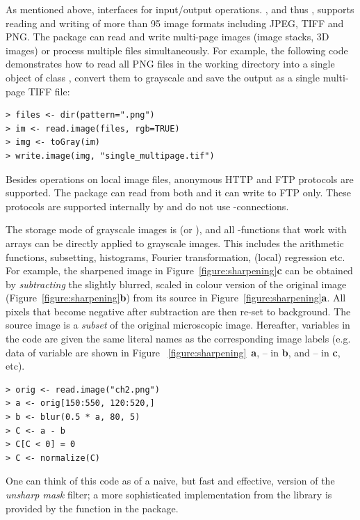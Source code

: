 As mentioned above,  interfaces  for input/output operations. , and thus , supports reading and writing of more than 95 image formats including JPEG, TIFF and PNG. The package can read and write multi-page images (image stacks, 3D images) or process multiple files simultaneously. For example, the following code demonstrates how to read all PNG files in the working directory into a single object of class , convert them to grayscale and save the output as a single multi-page TIFF file:

\begin{verbatim}
> files <- dir(pattern=".png")
> im <- read.image(files, rgb=TRUE)
> img <- toGray(im)
> write.image(img, "single_multipage.tif")
\end{verbatim}

Besides operations on local image files, anonymous HTTP and FTP protocols are supported. The package can read from both and it can write to FTP only. These protocols are supported internally by  and do not use \R{}-connections.

The storage mode of grayscale images is  (or ), and all \R{}-functions that work with arrays can be directly applied to grayscale images. This includes the arithmetic functions, subsetting, histograms, Fourier transformation, (local) regression etc. For example, the sharpened image in Figure~\ref{figure:sharpening}{\bf c} can be obtained by {\em subtracting} the slightly blurred, scaled in colour version of the original image (Figure~\ref{figure:sharpening}{\bf b}) from its source in Figure~\ref{figure:sharpening}{\bf a}. All pixels that become negative after subtraction are then re-set to background. The source image is a {\em subset} of the original microscopic image. Hereafter, variables in the code are given the same literal names as the corresponding image labels (e.g. data of variable  are shown in Figure ~\ref{figure:sharpening}~{\bf a},  -- in {\bf b}, and  -- in {\bf c}, etc).

\begin{verbatim}
> orig <- read.image("ch2.png")
> a <- orig[150:550, 120:520,]
> b <- blur(0.5 * a, 80, 5)
> C <- a - b
> C[C < 0] = 0
> C <- normalize(C)
\end{verbatim}

One can think of this code as of a naive, but fast and effective, version of the {\em unsharp mask} filter; a more sophisticated implementation from the  library is provided by the function  in the package.

